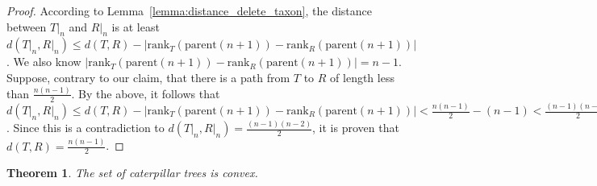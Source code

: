 \documentclass{amsart}
\newcommand{\parent}{\mathrm{parent}}
\newcommand{\rank}{\mathrm{rank}}
\newtheorem{theorem}[definition]{Theorem}
\begin{document}
\begin{proof}
    According to Lemma~\ref{lemma:distance_delete_taxon}, the distance between $T{\big|}_n$ and $R{\big|}_n$ is at least $d(T{\big|}_n, R{\big|}_n) \leq d(T,R) - |\rank_T(\parent(n+1)) - \rank_R(\parent(n+1))|$.
    We also know $|\rank_T(\parent(n+1)) - \rank_R(\parent(n+1))| = n-1$.
    Suppose, contrary to our claim, that there is a path from $T$ to $R$ of length less than $\frac{n(n-1)}{2}$.
    By the above, it follows that $d(T{\big|}_n, R{\big|}_n) \leq d(T,R) - |\rank_T(\parent(n+1)) - \rank_R(\parent(n+1))| < \frac{n(n-1)}{2} - (n-1) < \frac{(n-1)(n-2)}{2}$.
    Since this is a contradiction to $d(T{\big|}_n, R{\big|}_n) = \frac{(n-1)(n-2)}{2}$, it is proven that $d(T,R) = \frac{n(n-1)}{2} $.
\end{proof}

\begin{theorem}
    The set of caterpillar trees is convex.
    \label{thm:caterpillar_convex}
\end{theorem}
\end{document}

